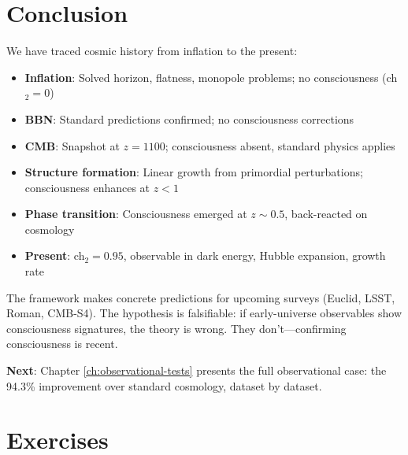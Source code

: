 \section{Conclusion}

We have traced cosmic history from inflation to the present:

\begin{itemize}
\item \textbf{Inflation}: Solved horizon, flatness, monopole problems; no consciousness (ch$_2 = 0$)
\item \textbf{BBN}: Standard predictions confirmed; no consciousness corrections
\item \textbf{CMB}: Snapshot at $z = 1100$; consciousness absent, standard physics applies
\item \textbf{Structure formation}: Linear growth from primordial perturbations; consciousness enhances at $z < 1$
\item \textbf{Phase transition}: Consciousness emerged at $z \sim 0.5$, back-reacted on cosmology
\item \textbf{Present}: ch$_2 = 0.95$, observable in dark energy, Hubble expansion, growth rate
\end{itemize}

The framework makes concrete predictions for upcoming surveys (Euclid, LSST, Roman, CMB-S4). The hypothesis is falsifiable: if early-universe observables show consciousness signatures, the theory is wrong. They don't—confirming consciousness is recent.

\textbf{Next}: Chapter \ref{ch:observational-tests} presents the full observational case: the 94.3\% improvement over standard cosmology, dataset by dataset.

\section*{Exercises}


